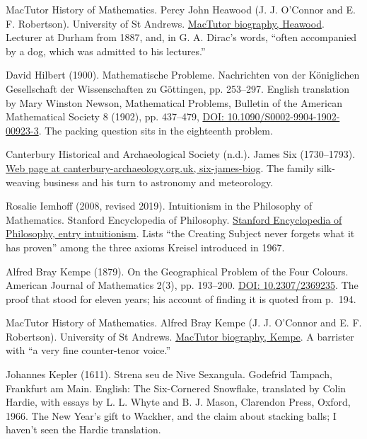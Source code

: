 \documentclass[11pt,twoside]{article}
\theoremstyle{thielethm}
\theoremstyle{thieledef}
\theoremstyle{thieledef}
\theoremstyle{thieledef}
\theoremstyle{thielethm}
\theoremstyle{thieleobs}
\theoremstyle{thielethm}
\begin{document}
\noindent MacTutor History of Mathematics. Percy John Heawood (J. J. O'Connor and E. F. Robertson). University of St Andrews. \href{https://mathshistory.st-andrews.ac.uk/Biographies/Heawood/}{MacTutor biography, Heawood}. Lecturer at Durham from 1887, and, in G. A. Dirac's words, ``often accompanied by a dog, which was admitted to his lectures.''
\par\medskip

\noindent David Hilbert (1900). Mathematische Probleme. Nachrichten von der K\"oniglichen Gesellschaft der Wissenschaften zu G\"ottingen, pp. 253--297. English translation by Mary Winston Newson, Mathematical Problems, Bulletin of the American Mathematical Society 8 (1902), pp. 437--479, \href{https://doi.org/10.1090/S0002-9904-1902-00923-3}{DOI: 10.1090/S0002-9904-1902-00923-3}. The packing question sits in the eighteenth problem.
\par\medskip

\noindent Canterbury Historical and Archaeological Society (n.d.). James Six (1730--1793). \href{https://www.canterbury-archaeology.org.uk/six-james-biog}{Web page at canterbury-archaeology.org.uk, six-james-biog}. The family silk-weaving business and his turn to astronomy and meteorology.
\par\medskip

\noindent Rosalie Iemhoff (2008, revised 2019). Intuitionism in the Philosophy of Mathematics. Stanford Encyclopedia of Philosophy. \href{https://plato.stanford.edu/entries/intuitionism/}{Stanford Encyclopedia of Philosophy, entry intuitionism}. Lists ``the Creating Subject never forgets what it has proven'' among the three axioms Kreisel introduced in 1967.
\par\medskip

\noindent Alfred Bray Kempe (1879). On the Geographical Problem of the Four Colours. American Journal of Mathematics 2(3), pp. 193--200. \href{https://doi.org/10.2307/2369235}{DOI: 10.2307/2369235}. The proof that stood for eleven years; his account of finding it is quoted from p.~194.
\par\medskip

\noindent MacTutor History of Mathematics. Alfred Bray Kempe (J. J. O'Connor and E. F. Robertson). University of St Andrews. \href{https://mathshistory.st-andrews.ac.uk/Biographies/Kempe/}{MacTutor biography, Kempe}. A barrister with ``a very fine counter-tenor voice.''
\par\medskip

\noindent Johannes Kepler (1611). Strena seu de Nive Sexangula. Godefrid Tampach, Frankfurt am Main. English: The Six-Cornered Snowflake, translated by Colin Hardie, with essays by L. L. Whyte and B. J. Mason, Clarendon Press, Oxford, 1966. The New Year's gift to Wackher, and the claim about stacking balls; I haven't seen the Hardie translation.
\par\medskip
\end{document}
